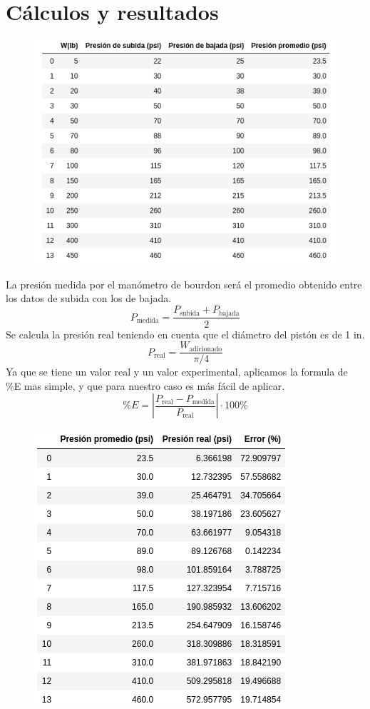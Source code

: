 \documentclass[a4paper,12pt]{report}
\begin{document}
\chapter{Cálculos y resultados}
\begin{figure}[H]
\centering
\includegraphics[scale=0.65]{tabla.png}
\end{figure}
La presión medida por el manómetro de bourdon será el promedio obtenido entre los datos de subida con los de bajada.
$$
P_{\mathrm{medida}} = \frac{P_{\mathrm{subida}} + P_{\mathrm{bajada}}}{2}
$$
Se calcula la presión real teniendo en cuenta que el diámetro del pistón es de 1 in.
$$
P_{\mathrm{real}} = \frac{W_{\mathrm{adicionado}}}{\pi/4}
$$
Ya que se tiene un valor real y un valor experimental, aplicamos la formula de \%E mas simple, y que para nuestro caso es más fácil de aplicar.
$$
\% E = \left\vert \frac{P_{\mathrm{real}} - P_{\mathrm{medida}}}{P_{\mathrm{real}}} \right\vert \cdot 100\%
$$
\begin{figure}[H]
\centering
\includegraphics[scale=0.65]{tabla2.png}
\end{figure}
\end{document}
